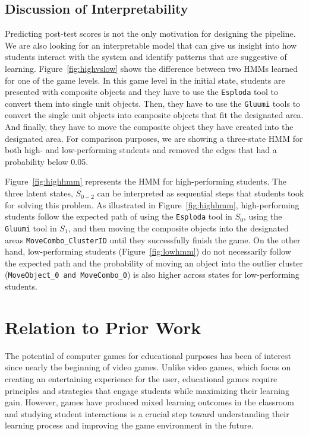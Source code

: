 \documentclass{sigchi}
\begin{document}
	\newpage
	\subsection{Discussion of Interpretability}

	Predicting post-test scores is not the only motivation for designing the pipeline.
	We are also looking for an interpretable model that can give us insight into how students interact with the system and identify patterns that are suggestive of learning. 
	Figure~\ref{fig:highvslow} shows the difference between two HMMs learned for one of the game levels.
	In this game level in the initial state, students are presented with composite objects and they have to use the \texttt{Esploda} tool to convert them into single unit objects. 
	Then, they have to use the \texttt{Gluumi} tools to convert the single unit objects into composite objects that fit the designated area. 
	And finally, they have to move the composite object they have created into the designated area.
	For comparison purposes, we are showing a three-state HMM for both high- and low-performing students and removed the edges that had a probability below 0.05.
	
	Figure~\ref{fig:highhmm} represents the HMM for high-performing students. 
	The three latent states, $S_{0-2}$ can be interpreted as sequential steps that students took for solving this problem. As illustrated in Figure~\ref{fig:highhmm}, high-performing students follow the expected path of using the \texttt{Esploda} tool in $S_0$, using the \texttt{Gluumi} tool in $S_1$, and then moving the composite objects into the designated areas \texttt{MoveCombo\_{ClusterID}} until they successfully finish the game.
	On the other hand, low-performing students (Figure~\ref{fig:lowhmm}) do not necessarily follow the expected path and the probability of moving an object into the outlier cluster (\texttt{MoveObject\_0 and MoveCombo\_0}) is also higher across states for low-performing students.
	
	\section{Relation to Prior Work}
	\label{sec:priorwork}
	The potential of computer games for educational purposes has been of interest since nearly the beginning of video games. 
	Unlike video games, which focus on creating an entertaining experience for the user, educational games require principles and strategies that engage students while maximizing their learning gain. 
	However, games have produced mixed learning outcomes in the classroom \cite{harpstead2013search,mayo2009video} and studying student interactions is a crucial step toward understanding their learning process and improving the game environment in the future.
	
\end{document}
